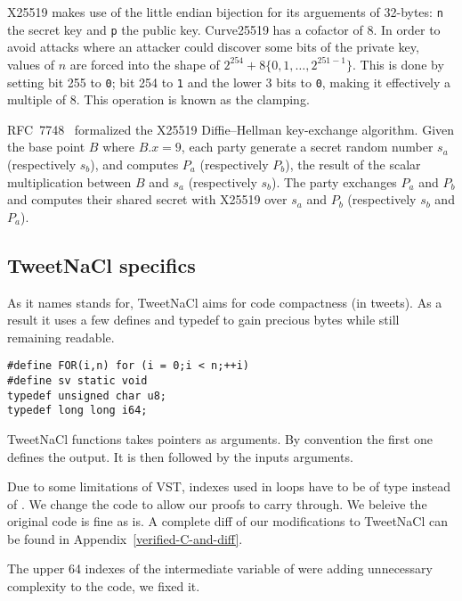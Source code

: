 X25519 makes use of the little endian bijection for its arguements of 32-bytes:
\texttt{n} the secret key and \texttt{p} the public key.
Curve25519 has a cofactor of 8. In order to avoid attacks where an attacker
could discover some bits of the private key, values of $n$ are forced into the
shape of $2^{254} + 8\{0,1,\ldots,2^{251-1}\}$. This is done by setting bit 255
to \texttt{0}; bit 254 to \texttt{1} and the lower 3 bits to \texttt{0},
making it effectively a multiple of 8. This operation is known as the clamping.

RFC~7748~\cite{rfc7748} formalized the X25519 Diffie–Hellman key-exchange algorithm.
Given the base point $B$ where $B.x=9$, each party generate a secret random number
$s_a$ (respectively $s_b$), and computes $P_a$ (respectively $P_b$), the result
of the scalar multiplication between $B$ and $s_a$ (respectively $s_b$).
The party exchanges $P_a$ and $P_b$ and computes their shared secret with X25519
over $s_a$ and $P_b$ (respectively $s_b$ and $P_a$).

\subsection{TweetNaCl specifics}
\label{preliminaries:B}

As it names stands for, TweetNaCl aims for code compactness (in tweets).
As a result it uses a few defines and typedef to gain precious bytes while
still remaining readable.
\begin{lstlisting}[language=Ctweetnacl]
#define FOR(i,n) for (i = 0;i < n;++i)
#define sv static void
typedef unsigned char u8;
typedef long long i64;
\end{lstlisting}

TweetNaCl functions takes pointers as arguments. By convention the first one
defines the output. It is then followed by the inputs arguments.

Due to some limitations of VST, indexes used in  loops have to be
of type  instead of . We change the code to allow our
proofs to carry through. We beleive the original code is fine as is.
A complete diff of our modifications to TweetNaCl can be found in
Appendix~\ref{verified-C-and-diff}.

The upper 64 indexes of the  intermediate variable of
 were adding unnecessary complexity to the code,
we fixed it.

